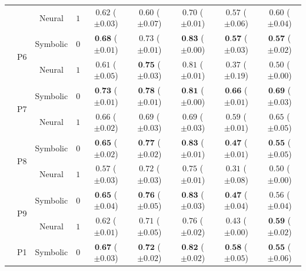 \begin{table}[!t]
\begin{tabular}{ccccccccc}
		&  & Neural & $1$ & $0.62 $ {\tiny ($\pm 0.03$)} & $0.60 $ {\tiny ($\pm 0.07$)} & $0.70 $ {\tiny ($\pm 0.01$)} & $0.57 $ {\tiny ($\pm 0.06$)} & $0.60 $ {\tiny ($\pm 0.04$)}\\
		\cmidrule{2-9}
		& \multirow{2}{*}{P6} & Symbolic & $0$ & $\textbf{0.68} $ {\tiny ($\pm 0.01$)} & $0.73 $ {\tiny ($\pm 0.01$)} & $\textbf{0.83} $ {\tiny ($\pm 0.00$)} & $\textbf{0.57} $ {\tiny ($\pm 0.03$)} & $\textbf{0.57} $ {\tiny ($\pm 0.02$)}\\
		&  & Neural & $1$ & $0.61 $ {\tiny ($\pm 0.05$)} & $\textbf{0.75} $ {\tiny ($\pm 0.03$)} & $0.81 $ {\tiny ($\pm 0.01$)} & $0.37 $ {\tiny ($\pm 0.19$)} & $0.50 $ {\tiny ($\pm 0.00$)}\\
		\cmidrule{2-9}
		& \multirow{2}{*}{P7} & Symbolic & $0$ & $\textbf{0.73} $ {\tiny ($\pm 0.01$)} & $\textbf{0.78} $ {\tiny ($\pm 0.01$)} & $\textbf{0.81} $ {\tiny ($\pm 0.00$)} & $\textbf{0.66} $ {\tiny ($\pm 0.01$)} & $\textbf{0.69} $ {\tiny ($\pm 0.03$)}\\
		&  & Neural & $1$ & $0.66 $ {\tiny ($\pm 0.02$)} & $0.69 $ {\tiny ($\pm 0.03$)} & $0.69 $ {\tiny ($\pm 0.03$)} & $0.59 $ {\tiny ($\pm 0.01$)} & $0.65 $ {\tiny ($\pm 0.05$)}\\
		\cmidrule{2-9}
		& \multirow{2}{*}{P8} & Symbolic & $0$ & $\textbf{0.65} $ {\tiny ($\pm 0.02$)} & $\textbf{0.77} $ {\tiny ($\pm 0.02$)} & $\textbf{0.83} $ {\tiny ($\pm 0.01$)} & $\textbf{0.47} $ {\tiny ($\pm 0.01$)} & $\textbf{0.55} $ {\tiny ($\pm 0.05$)}\\
		&  & Neural & $1$ & $0.57 $ {\tiny ($\pm 0.03$)} & $0.72 $ {\tiny ($\pm 0.03$)} & $0.75 $ {\tiny ($\pm 0.01$)} & $0.31 $ {\tiny ($\pm 0.08$)} & $0.50 $ {\tiny ($\pm 0.00$)}\\
		\cmidrule{2-9}
		& \multirow{2}{*}{P9} & Symbolic & $0$ & $\textbf{0.65} $ {\tiny ($\pm 0.04$)} & $\textbf{0.76} $ {\tiny ($\pm 0.05$)} & $\textbf{0.83} $ {\tiny ($\pm 0.03$)} & $\textbf{0.47} $ {\tiny ($\pm 0.04$)} & $0.56 $ {\tiny ($\pm 0.04$)}\\
		&  & Neural & $1$ & $0.62 $ {\tiny ($\pm 0.01$)} & $0.71 $ {\tiny ($\pm 0.05$)} & $0.76 $ {\tiny ($\pm 0.02$)} & $0.43 $ {\tiny ($\pm 0.00$)} & $\textbf{0.59} $ {\tiny ($\pm 0.02$)}\\
		\bottomrule\toprule
		\multirow{19}{*}{\rotatebox[origin=c]{90}{Propositional}} & \multirow{2}{*}{P1} & Symbolic & $0$ & $\textbf{0.67} $ {\tiny ($\pm 0.03$)} & $\textbf{0.72} $ {\tiny ($\pm 0.02$)} & $\textbf{0.82} $ {\tiny ($\pm 0.02$)} & $\textbf{0.58} $ {\tiny ($\pm 0.05$)} & $\textbf{0.55} $ {\tiny ($\pm 0.06$)}\\

\end{tabular}
\end{table}
